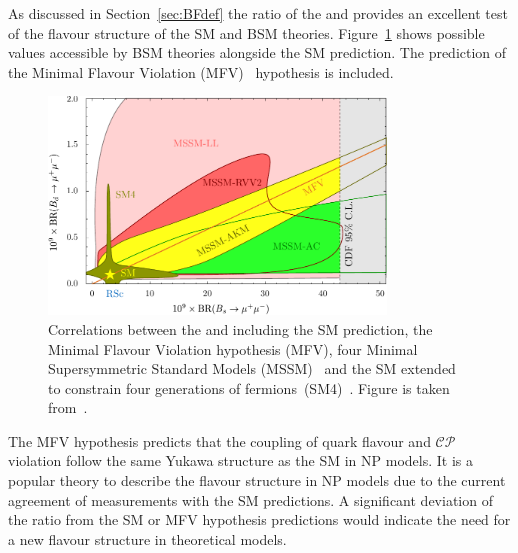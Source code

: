 As discussed in Section~\ref{sec:BFdef} the ratio of the \bdmumu and \bsmumu \Bfs provides an excellent test of the flavour structure of the SM and BSM theories. %
Figure~\ref{fig:ratio} shows possible values accessible by BSM theories alongside the SM prediction. The prediction of the Minimal Flavour Violation (MFV)~\cite{DAmbrosio:2002vsn} hypothesis is included. %
\begin{figure}[htbp]
    \centering
        \includegraphics[width=0.8\textwidth]{./Figs/Theory/MFV.pdf}
    \caption{Correlations between the \bdmumu and \bsmumu \BFs including the SM prediction, the Minimal Flavour Violation hypothesis (MFV), four Minimal Supersymmetric Standard Models (MSSM)~\cite{Martin:1997ns} and the SM extended to constrain four generations of fermions~(SM4)~\cite{Hou:2008xd}. Figure is taken from~\cite{Straub:2010ih}.}
    \label{fig:ratio}
\end{figure}
The MFV hypothesis predicts that the coupling of quark flavour and $\mathcal{CP}$ violation follow the same Yukawa structure as the SM in NP models. It is a popular theory to describe the flavour structure in NP models due to the current agreement of measurements with the SM predictions. A significant deviation of the \BF ratio from the SM or MFV hypothesis predictions would indicate the need for a new flavour structure in theoretical models.

